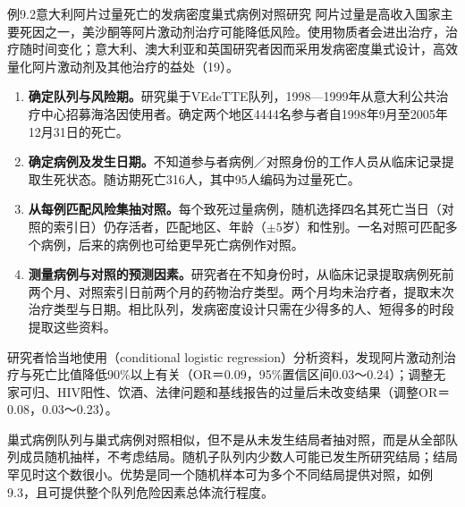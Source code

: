 \begin{bookbox}{例9.2\quad 意大利阿片过量死亡的发病密度巢式病例对照研究}
阿片过量是高收入国家主要死因之一，美沙酮等阿片激动剂治疗可能降低风险。使用物质者会进出治疗，治疗随时间变化；意大利、澳大利亚和英国研究者因而采用发病密度巢式设计，高效量化阿片激动剂及其他治疗的益处（19）。
\begin{enumerate}
\item \textbf{确定队列与风险期。}研究巢于VEdeTTE队列，1998—1999年从意大利公共治疗中心招募海洛因使用者。确定两个地区4444名参与者自1998年9月至2005年12月31日的死亡。
\item \textbf{确定病例及发生日期。}不知道参与者病例／对照身份的工作人员从临床记录提取生死状态。随访期死亡316人，其中95人编码为过量死亡。
\item \textbf{从每例匹配风险集抽对照。}每个致死过量病例，随机选择四名其死亡当日（对照的索引日）仍存活者，匹配地区、年龄（$\pm5$岁）和性别。一名对照可匹配多个病例，后来的病例也可给更早死亡病例作对照。
\item \textbf{测量病例与对照的预测因素。}研究者在不知身份时，从临床记录提取病例死前两个月、对照索引日前两个月的药物治疗类型。两个月均未治疗者，提取末次治疗类型与日期。相比队列，发病密度设计只需在少得多的人、短得多的时段提取这些资料。
\end{enumerate}
研究者恰当地使用（conditional logistic regression）分析资料，发现阿片激动剂治疗与死亡比值降低90\%以上有关（OR＝0.09，95\%置信区间0.03～0.24）；调整无家可归、HIV阳性、饮酒、法律问题和基线报告的过量后未改变结果（调整OR＝0.08，0.03～0.23）。
\end{bookbox}

巢式病例队列与巢式病例对照相似，但不是从未发生结局者抽对照，而是从全部队列成员随机抽样，不考虑结局。随机子队列内少数人可能已发生所研究结局；结局罕见时这个数很小。优势是同一个随机样本可为多个不同结局提供对照，如例9.3，且可提供整个队列危险因素总体流行程度。

